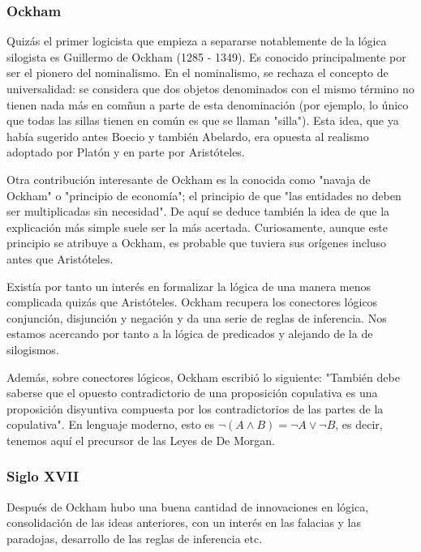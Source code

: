 \documentclass{article}
\begin{document}
\subsubsection{Ockham}

Quizás el primer logicista que empieza a separarse notablemente de la lógica silogista es Guillermo de Ockham (1285 - 1349). Es conocido principalmente por ser el pionero del nominalismo. En el nominalismo, se rechaza el concepto de universalidad: se considera que dos objetos denominados con el mismo término no tienen nada más en comñun a parte de esta denominación (por ejemplo, lo único que todas las sillas tienen en común es que se llaman "silla"). Esta idea, que ya había sugerido antes Boecio\cite{blackburn2005oxford} y también Abelardo, era opuesta al realismo adoptado por Platón y en parte por Aristóteles.

Otra contribución interesante de Ockham es la conocida como "navaja de Ockham" o "principio de economía"; el principio de que "las entidades no deben ser multiplicadas sin necesidad"\cite{blackburn2005oxford}. De aquí se deduce también la idea de que la explicación más simple suele ser la más acertada. Curiosamente, aunque este principio se atribuye a Ockham, es probable que tuviera sus orígenes incluso antes que Aristóteles\cite{thorburn1918myth}.

Existía por tanto un interés en formalizar la lógica de una manera menos complicada quizás que Aristóteles. Ockham recupera los conectores lógicos conjunción, disjunción y negación y da una serie de reglas de inferencia\cite{boehner1990philosophical}. Nos estamos acercando por tanto a la lógica de predicados y alejando de la de silogismos.

Además, sobre conectores lógicos, Ockham escribió lo siguiente: "También debe saberse que el opuesto contradictorio de una proposición copulativa es una proposición disyuntiva compuesta por los contradictorios de las partes de la copulativa"\cite{logicmuseum_ockham}. En lenguaje moderno, esto es $\lnot (A \land B) = \lnot A \lor \lnot B$, es decir, tenemos aquí el precursor de las Leyes de De Morgan.

\subsubsection{Siglo XVII}

Después de Ockham hubo una buena cantidad de innovaciones en lógica, consolidación de las ideas anteriores, con un interés en las falacias y las paradojas, desarrollo de las reglas de inferencia etc.
\end{document}
